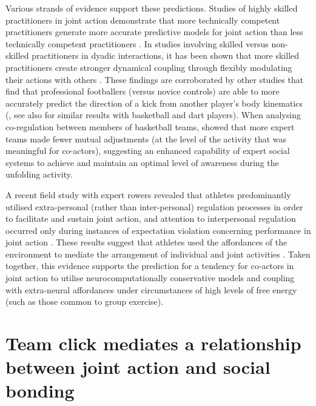 \begin{CJK}{UTF8}{gbsn}
    Various strands of evidence support these predictions.  Studies of highly skilled practitioners in joint action demonstrate that more technically competent practitioners generate more accurate predictive models for joint action than less technically competent practitioners \citep{Tomeo2012,Aglioti2008,Mulligan2016}.   In studies involving skilled versus non-skilled practitioners in dyadic interactions, it has been shown that more skilled practitioners create stronger dynamical coupling through flexibly modulating their actions with others \citep{Schmidt2011,Caron2017}. These findings are corroborated by other studies that find that professional footballers (versus novice controls) are able to more accurately predict the direction of a kick from another player's body kinematics (\cite{Tomeo2012}, see also \cite{Aglioti2008,Mulligan2016} for similar results with basketball and dart players).  When analysing co-regulation between members of basketball teams, \textcite{Bourbousson2015} showed that more expert teams made fewer mutual adjustments (at the level of the activity that was meaningful for co-actors), suggesting an enhanced capability of expert social systems to achieve and maintain an optimal level of awareness during the unfolding activity.

    A recent field study with expert rowers revealed that athletes predominantly utilised
    extra-personal (rather than inter-personal) regulation processes in order to facilitate and sustain joint action, and attention to interpersonal regulation occurred only during instances of expectation violation concerning performance in joint action \citep[; for a full explanation of this study, see Appendix ~\ref{app2:theory} Section ~\ref{sect:rowerStudy}]{RKiouak2016}. These results suggest that athletes used the affordances of the environment to mediate the arrangement of individual and joint activities \citep{Bourbousson2011,Bourbousson2012}.  Taken together, this evidence supports the prediction for a tendency for co-actors in joint action to utilise neurocomputationally conservative models and coupling with extra-neural affordances under circumstances of high levels of free energy (such as those common to group exercise).













\section{Team click mediates a relationship between joint action and social bonding}



\end{CJK}
